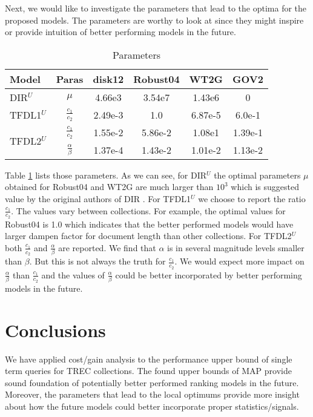 Next, we would like to investigate the parameters that lead to the 
optima for the proposed models. The parameters are worthy to 
look at since they might inspire or provide intuition of better 
performing models in the future.
\begin{table}[t]
\centering
\caption{Parameters}
\label{tab:results_paras}
\begin{tabular}{ lccccc } \hline
Model & Paras & disk12 & Robust04 & WT2G & GOV2 \\\hline \hline
DIR$^U$ & $\mu$ & 4.66e3 & 3.54e7 & 1.43e6 & 0 \\ \hline
TFDL1$^U$ & $\frac{c_1}{c_2}$ & 2.49e-3 & 1.0 & 6.87e-5 & 6.0e-1 \\ \hline
\multirow{2}{*}{TFDL2$^U$} & $\frac{c_1}{c_2}$ & 1.55e-2 & 5.86e-2 & 1.08e1 & 1.39e-1 \\
& $\frac{\alpha}{\beta}$ & 1.37e-4 & 1.43e-2 & 1.01e-2 & 1.13e-2 \\ \hline
\end{tabular}
\end{table}
Table \ref{tab:results_paras} lists those parameters. 
As we can see, for DIR$^U$ the optimal parameters $\mu$ obtained for 
Robust04 and WT2G are much larger than $10^{3}$ which is suggested 
value by the original authors of DIR 
\cite{Zhai:2004:SSM:984321.984322}. 
For TFDL1$^U$ we choose to report the ratio $\frac{c_1}{c_2}$. 
The values vary between collections. 
For example, the optimal values for Robust04 is 1.0 which indicates that 
the better performed models would have larger dampen factor for document 
length than other collections.  
For TFDL2$^U$ both $\frac{c_1}{c_2}$ and $\frac{\alpha}{\beta}$ are 
reported. We find that $\alpha$ is in several magnitude levels 
smaller than $\beta$. But this is not always the truth for $\frac{c_1}{c_2}$. 
We would expect more impact on $\frac{\alpha}{\beta}$ than 
$\frac{c_1}{c_2}$ and the values of $\frac{\alpha}{\beta}$ 
could be better incorporated by better performing models in 
the future.


\section{Conclusions}
\label{sec:con}

We have applied cost/gain analysis to the performance 
upper bound of single term queries for TREC collections. 
The found upper bounds of MAP provide sound foundation 
of potentially better performed ranking models in the 
future. Moreover, the parameters that lead to the local 
optimums provide more insight about how the future models 
could better incorporate proper statistics/signals.

